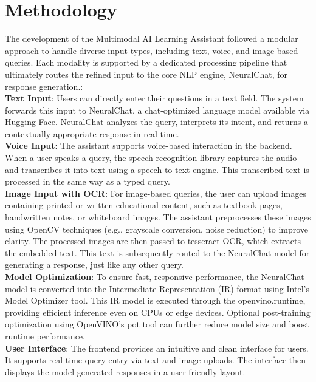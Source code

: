 \documentclass{josis}
\begin{document}
\section{Methodology}
  The development of the Multimodal AI Learning Assistant followed a modular approach to handle diverse input types, including text, voice, and image-based queries. Each modality is supported by a dedicated processing pipeline that ultimately routes the refined input to the core NLP engine, NeuralChat, for response generation.:\\ 
\textbf{Text Input}: Users can directly enter their questions in a text field. The system forwards this input to NeuralChat, a chat-optimized language model available via Hugging Face. NeuralChat analyzes the query, interprets its intent, and returns a contextually appropriate response in real-time.\\
\textbf{Voice Input}: The assistant supports voice-based interaction in the backend. When a user speaks a query, the speech recognition library captures the audio and transcribes it into text using a speech-to-text engine. This transcribed text is processed in the same way as a typed query. \\
\textbf{Image Input with OCR}: For image-based queries, the user can upload images containing printed or written educational content, such as textbook pages, handwritten notes, or whiteboard images. The assistant preprocesses these images using OpenCV techniques (e.g., grayscale conversion, noise reduction) to improve clarity. The processed images are then passed to tesseract OCR, which extracts the embedded text. This text is subsequently routed to the NeuralChat model for generating a response, just like any other query.\\
\textbf{Model Optimization}: To ensure fast, responsive performance, the NeuralChat model is converted into the Intermediate Representation (IR) format using Intel's Model Optimizer tool. This IR model is executed through the openvino.runtime, providing efficient inference even on CPUs or edge devices. Optional post-training optimization using OpenVINO's pot tool can further reduce model size and boost runtime performance.\\
\textbf{User Interface}: The frontend provides an intuitive and clean interface for users. It supports real-time query entry via text and image uploads. The interface then displays the model-generated responses in a user-friendly layout. 
\end{document}
